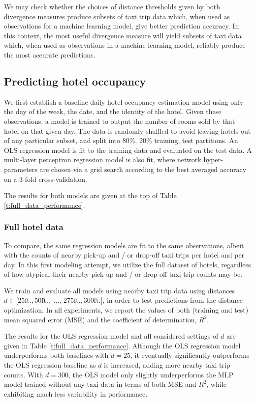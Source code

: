 \documentclass[useAMS, usenatbib]{biom}
\begin{document}
We may check whether the choices of distance thresholds given by both divergence measures produce subsets of taxi trip data which, when used as observations for a machine learning model, give better prediction accuracy. In this context, the most useful divergence measure will yield subsets of taxi data which, when used as observations in a machine learning model, reliably produce the most accurate predictions.

\subsection{Predicting hotel occupancy}
\label{ss:predicting}

We first establish a baseline daily hotel occupancy estimation model using only the day of the week, the date, and the identity of the hotel. Given these observations, a model is trained to output the number of rooms sold by that hotel on that given day. The data is randomly shuffled to avoid leaving hotels out of any particular subset, and split into 80\%, 20\% training, test partitions. An OLS regression model is fit to the training data and evaluated on the test data. A multi-layer perceptron regression model is also fit, where network hyper-parameters are chosen via a grid search according to the best averaged accuracy on a 3-fold cross-validation.

The results for both models are given at the top of Table \ref{t:full_data_performance}.

\subsubsection{Full hotel data}

To compare, the same regression models are fit to the same observations, albeit with the counts of nearby pick-up and / or drop-off taxi trips per hotel and per day. In this first modeling attempt, we utilize the full dataset of hotels, regardless of how atypical their nearby pick-up and / or drop-off taxi trip counts may be.

We train and evaluate all models using nearby taxi trip data using distances $d \in [25 \mathrm{ft.}, 50 \mathrm{ft.},$ ..., $275 \mathrm{ft.}, 300 \mathrm{ft.}]$, in order to test predictions from the distance optimization. In all experiments, we report the values of both (training and test) mean squared error (MSE) and the coefficient of determination, $R^2$.

The results for the OLS regression model and all considered settings of $d$ are given in Table \ref{t:full_data_performance}. Although the OLS regression model underperforms both baselines with $d = 25$, it eventually significantly outperforms the OLS regression baseline as $d$ is increased, adding more nearby taxi trip counts. With $d = 300$, the OLS model only slightly underperforms the MLP model trained without any taxi data in terms of both MSE and $R^2$, while exhibiting much less variability in performance.
\end{document}

